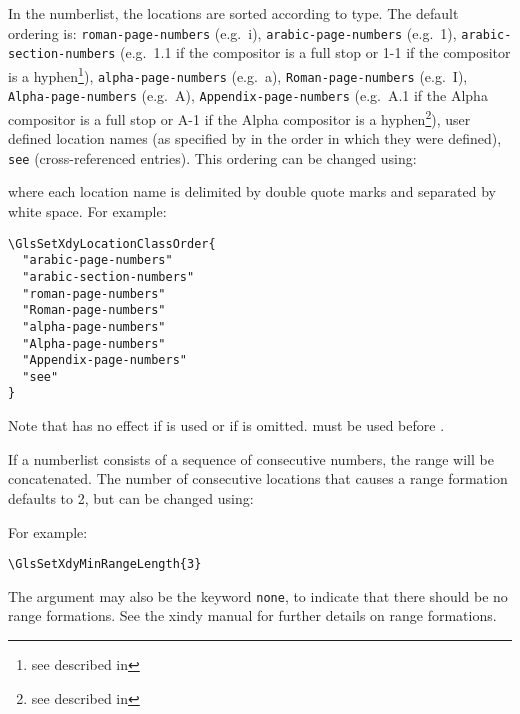 \documentclass[report,inlinetitle]{nlctdoc}
\begin{document}
In the \gls{numberlist}, the locations are sorted according to
type. The default ordering is: \texttt{roman-page-numbers} (e.g.\
i), \texttt{arabic-page-numbers} (e.g.\ 1),
\texttt{arabic-section-numbers} (e.g.\ 1.1 if the compositor is a
full stop or 1-1 if the compositor is a hyphen\footnote{see
 described in }),
\texttt{alpha-page-numbers} (e.g.\ a), \texttt{Roman-page-numbers}
(e.g.\ I), \texttt{Alpha-page-numbers} (e.g.\ A),
\texttt{Appendix-page-numbers} (e.g.\ A.1 if the Alpha compositor is
a full stop or A-1 if the Alpha compositor is a hyphen\footnote{see
\ics{setAlphaCompositor} described in
}), user defined location names (as
specified by  in the order in which they were
defined), \texttt{see} (cross-referenced entries). This ordering can
be changed using:

\DescribeMacro{\GlsSetXdyLocationClassOrder}
\begin{definition}
\end{definition}
where each location name is delimited by double quote marks and
separated by white space. For example:
\begin{verbatim}
\GlsSetXdyLocationClassOrder{
  "arabic-page-numbers"
  "arabic-section-numbers"
  "roman-page-numbers"
  "Roman-page-numbers"
  "alpha-page-numbers"
  "Alpha-page-numbers"
  "Appendix-page-numbers"
  "see"
}
\end{verbatim}

\begin{important}
Note that  has no effect if 
 is used or if  is omitted.
\cs{GlsSetXdyLocationClassOrder} must be used before 
\ics{makeglossaries}.
\end{important}

If a \gls{numberlist} consists of a sequence of consecutive 
numbers, the range will be concatenated. The 
number of consecutive locations that causes a range formation 
defaults to 2, but can be changed using:\newpage

\DescribeMacro{\GlsSetXdyMinRangeLength}
\begin{definition}
\end{definition}
For example:
\begin{verbatim}
\GlsSetXdyMinRangeLength{3}
\end{verbatim}
The argument may also be the keyword \texttt{none}, to indicate that
there should be no range formations. See the \gls{xindy}
manual for further details on range formations.
\end{document}
